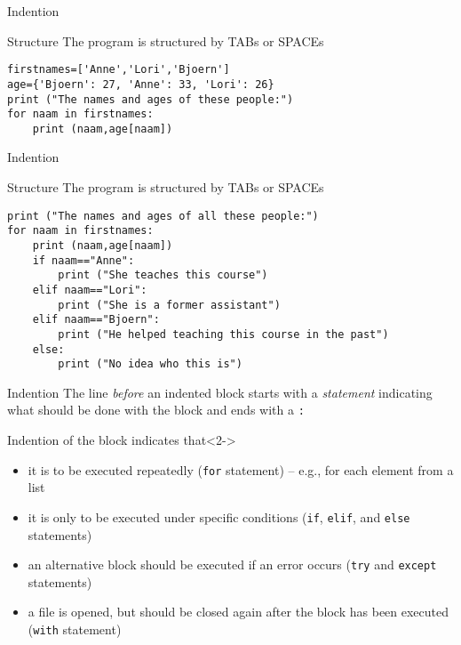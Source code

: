 \documentclass{beamer}
\begin{document}
\begin{frame}[fragile]{Indention}
\begin{block}{Structure}
The program is structured by TABs or SPACEs
\end{block}
\begin{lstlisting}
firstnames=['Anne','Lori','Bjoern']
age={'Bjoern': 27, 'Anne': 33, 'Lori': 26}
print ("The names and ages of these people:")
for naam in firstnames:
    print (naam,age[naam])
\end{lstlisting}
\end{frame}





\begin{frame}[fragile]{Indention}
\begin{block}{Structure}
The program is structured by TABs or SPACEs
\end{block}
\begin{lstlisting}
print ("The names and ages of all these people:")
for naam in firstnames:
    print (naam,age[naam])
    if naam=="Anne":
        print ("She teaches this course")
    elif naam=="Lori":
        print ("She is a former assistant")
    elif naam=="Bjoern":
        print ("He helped teaching this course in the past")
    else:
        print ("No idea who this is")
\end{lstlisting}
\end{frame}


\begin{frame}{Indention}
The line \emph{before} an indented block starts with a \emph{statement} indicating what should be done with the block and ends with a \texttt{:}

\begin{block}{Indention of the block indicates that}<2->
\begin{itemize}
\item<3-> it is to be executed repeatedly (\texttt{for} statement) – e.g., for each element from a list
\item<4-> it is only to be executed under specific conditions (\texttt{if}, \texttt{elif}, and \texttt{else} statements)
\item<5-> an alternative block should be executed if an error occurs (\texttt{try} and \texttt{except} statements)
\item<6-> a file is opened, but should be closed again after the block has been executed (\texttt{with} statement)
\end{itemize}
\end{block}
\end{frame}
\end{document}
